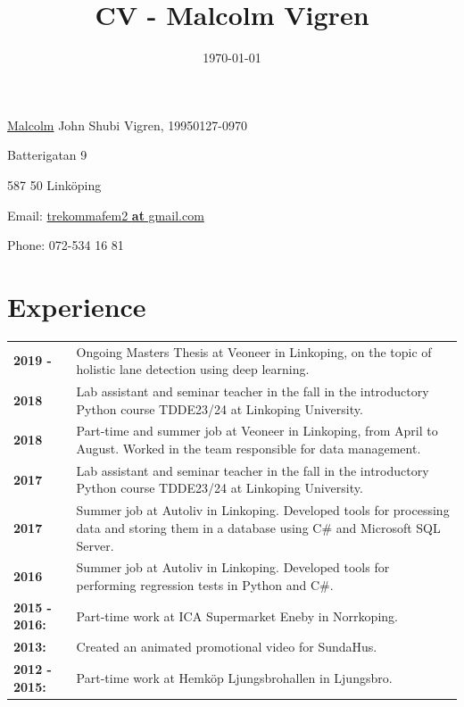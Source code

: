 \documentclass[a4paper,notitlepage]{article}
\title{
\huge{CV - Malcolm Vigren}\vspace{-3ex}}
\date{\today}
\begin{document}
	\maketitle
\underline{Malcolm} John Shubi Vigren, 19950127-0970

Batterigatan 9

587 50 Linköping

Email: \underline{trekommafem2 \textbf{at} gmail.com}

Phone: 072-534 16 81

\section*{Experience}
\noindent\begin{tabular}{@{}l p{13cm}}

\textbf{2019 -} & Ongoing Masters Thesis at Veoneer in Linkoping, on the topic
    of holistic lane detection using deep learning. \\

\textbf{2018} & Lab assistant and seminar teacher in the fall in the
    introductory Python course TDDE23/24 at Linkoping University. \\

\textbf{2018} & Part-time and summer job at Veoneer in Linkoping, from April to
    August. Worked in the team responsible for data management. \\

\textbf{2017} & Lab assistant and seminar teacher in the fall in the
    introductory Python course TDDE23/24 at Linkoping University. \\

\textbf{2017} & Summer job at Autoliv in Linkoping. Developed tools for
    processing data and storing them in a database using C\# and Microsoft SQL
    Server. \\

\textbf{2016} & Summer job at Autoliv in Linkoping. Developed tools for
    performing regression tests in Python and C\#.\\

\textbf{2015 - 2016:} & Part-time work at ICA Supermarket Eneby in Norrkoping. \\

\textbf{2013:} & Created an animated promotional video for SundaHus.
\\

\textbf{2012 - 2015:} & Part-time work at Hemköp Ljungsbrohallen in Ljungsbro. \\

	\end{tabular}
\end{document}
